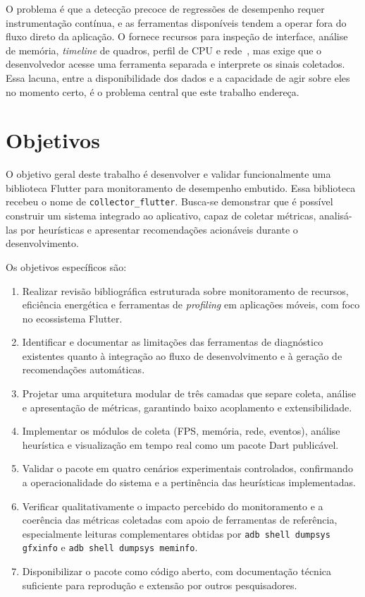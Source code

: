 O problema é que a detecção precoce de regressões de desempenho requer instrumentação contínua, e as ferramentas disponíveis tendem a operar fora do fluxo direto da aplicação. O \devtools{} fornece recursos para inspeção de interface, análise de memória, \textit{timeline} de quadros, perfil de CPU e rede~\cite{flutterDevTools2026}, mas exige que o desenvolvedor acesse uma ferramenta separada e interprete os sinais coletados. Essa lacuna, entre a disponibilidade dos dados e a capacidade de agir sobre eles no momento certo, é o problema central que este trabalho endereça.



\section{Objetivos}

O objetivo geral deste trabalho é desenvolver e validar funcionalmente uma biblioteca Flutter para monitoramento de desempenho embutido. Essa biblioteca recebeu o nome de \texttt{collector\_flutter}. Busca-se demonstrar que é possível construir um sistema integrado ao aplicativo, capaz de coletar métricas, analisá-las por heurísticas e apresentar recomendações acionáveis durante o desenvolvimento.

Os objetivos específicos são:

\begin{enumerate}
  \item Realizar revisão bibliográfica estruturada sobre monitoramento de recursos, eficiência energética e ferramentas de \textit{profiling} em aplicações móveis, com foco no ecossistema Flutter.
  \item Identificar e documentar as limitações das ferramentas de diagnóstico existentes quanto à integração ao fluxo de desenvolvimento e à geração de recomendações automáticas.
  \item Projetar uma arquitetura modular de três camadas que separe coleta, análise e apresentação de métricas, garantindo baixo acoplamento e extensibilidade.
  \item Implementar os módulos de coleta (FPS, memória, rede, eventos), análise heurística e visualização em tempo real como um pacote Dart publicável.
  \item Validar o pacote em quatro cenários experimentais controlados, confirmando a operacionalidade do sistema e a pertinência das heurísticas implementadas.
  \item Verificar qualitativamente o impacto percebido do monitoramento e a coerência das métricas coletadas com apoio de ferramentas de referência, especialmente leituras complementares obtidas por \texttt{adb shell dumpsys gfxinfo} e \texttt{adb shell dumpsys meminfo}.
  \item Disponibilizar o pacote como código aberto, com documentação técnica suficiente para reprodução e extensão por outros pesquisadores.
\end{enumerate}

